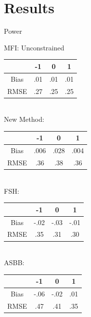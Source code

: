 \documentclass{beamer}
\begin{document}
\section{Results}
\begin{frame}{Power}
  \begin{center}
    MFI: Unconstrained\\
\begin{tabular}{ c c c c}
   & -1 & 0 & 1 \\
  \hline \hline 
  Bias & .01 & .01 & .01 \\
 RMSE & .27 & .25 & .25 \\  
\end{tabular}\\
New Method:\\
\begin{tabular}{ c c c c}
   & -1 & 0 & 1 \\
  \hline \hline 
  Bias & .006 & .028 & .004 \\
 RMSE & .36 & .38 & .36 \\  
\end{tabular}\\
FSH:\\
\begin{tabular}{ c c c c}
   & -1 & 0 & 1 \\
  \hline \hline 
  Bias & -.02 & -.03 & -.01 \\
 RMSE & .35 & .31 & .30 \\  
\end{tabular}\\
ASBB:\\
\begin{tabular}{ c c c c}
   & -1 & 0 & 1 \\
  \hline \hline 
  Bias & -.06 & -.02 & .01 \\
 RMSE & .47 & .41 & .35 \\  
\end{tabular}
\end{center}
\end{frame}
\end{document}
